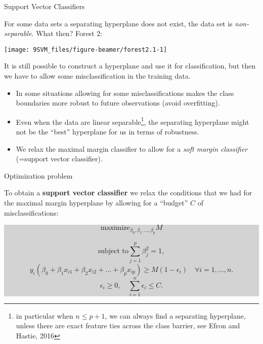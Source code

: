 \documentclass[10pt,ignorenonframetext,]{beamer}
\begin{document}
\begin{frame}{Support Vector Classifiers}

For some data sets a separating hyperplane does not exist, the data set
is \emph{non-separable}. What then? Forest 2:

\begin{center}\texttt{[image: 9SVM\_files/figure-beamer/forest2.1-1]} \end{center}

It is still possible to construct a hyperplane and use it for
classification, but then we have to allow some misclassification in the
training data.

\end{frame}

\begin{frame}

\begin{itemize}
\item
  In some situations allowing for some misclassifications makes the
  class boundaries more robust to future observations (avoid
  overfitting).
\item
  Even when the data are linear
  separable\footnote{in particular when $n\leq p+1$, we can always find a separating hyperplane, unless there are exact feature ties across the class barrier, see Efron and Hastie, 2016},
  the separating hyperplane might not be the ``best'' hyperplane for us
  in terms of robustness.
\item
  We relax the maximal margin classifier to allow for a \emph{soft
  margin classifier} (=support vector classifier).
\end{itemize}

\end{frame}

\begin{frame}

\begin{block}{Optimization problem}

\vspace{2mm}

To obtain a \textbf{support vector classifier} we relax the conditions
that we had for the maximal margin hyperplane by allowing for a
``budget'' \(C\) of misclassifications: \vspace{2mm}

\colorbox{lightgray}{\begin{minipage}{10cm}
$$\mathrm{maximize}_{\beta_0,\beta_1,...,\beta_p}  M $$

$$\text{subject to} \sum_{j=1}^p \beta_j^2=1,$$
$$y_i(\beta_0+\beta_1 x_{i1}+\beta_2 x_{i2}+...+\beta_p x_{ip})\geq M(1-\epsilon_i) \quad  \forall i=1,...,n.$$
$$\epsilon_i\geq 0, \quad \sum_{i=1}^n \epsilon_i \leq C.$$
\end{minipage}}

\end{block}

\end{frame}
\end{document}
